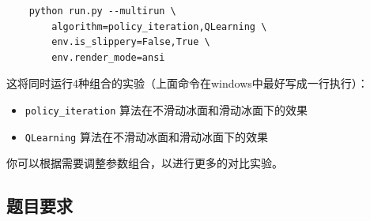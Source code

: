 \documentclass[a4paper,12pt]{article}
\begin{document}
\begin{enumerate}
\begin{verbatim}
    python run.py --multirun \
        algorithm=policy_iteration,QLearning \
        env.is_slippery=False,True \
        env.render_mode=ansi
    \end{verbatim}
    这将同时运行4种组合的实验（上面命令在windows中最好写成一行执行）：
    \begin{itemize}
        \item \texttt{policy_iteration} 算法在不滑动冰面和滑动冰面下的效果
        \item \texttt{QLearning} 算法在不滑动冰面和滑动冰面下的效果
    \end{itemize}
    你可以根据需要调整参数组合，以进行更多的对比实验。
\end{enumerate}

\subsection{题目要求}
\end{document}
